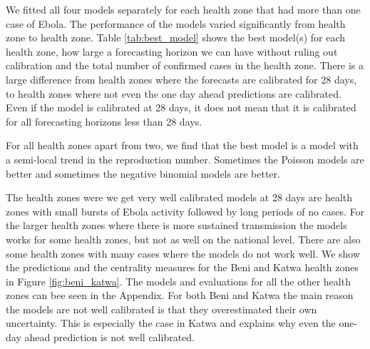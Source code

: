 \documentclass[12pt]{article}
\begin{document}
We fitted all four models separately for each health zone that had more than one case of Ebola. The performance of the models varied significantly from health zone to health zone. Table \ref{tab:best_model} shows the best model(s) for each health zone, how large a forecasting horizon we can have without ruling out calibration and the total number of confirmed cases in the health zone. There is a large difference from health zones where the forecasts are calibrated for 28 days, to health zones where not even the one day ahead predictions are calibrated. Even if the model is calibrated at 28 days, it does not mean that it is calibrated for all forecasting horizons less than 28 days. 




For all health zones apart from two, we find that the best model is a model with a semi-local trend in the reproduction number. Sometimes the Poisson models are better and sometimes the negative binomial models are better.

The health zones were we get very well calibrated models at 28 days are health zones with small bursts of Ebola activity followed by long periods of no cases. For the larger health zones where there is more sustained transmission the models works for some health zones, but not as well on the national level. There are also some health zones with many cases where the models do not work well. We show the predictions and the centrality measures for the Beni and Katwa health zones in Figure \ref{fig:beni_katwa}. The models and evaluations for all the other health zones can bee seen in the Appendix. For both Beni and Katwa the main reason the models are not well calibrated is that they overestimated their own uncertainty. This is especially the case in Katwa and explains why even the one-day ahead prediction is not well calibrated. 
\end{document}
